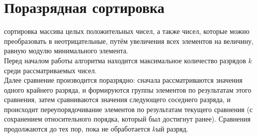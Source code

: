 \section{Поразрядная сортировка}
 сортировка массива целых положительных чисел, а также чисел, которые можно преобразовать в неотрицательные, путём увеличения всех элементов на величину, равную модулю минимального элемента.\\

Перед началом работы алгоритма находится максимальное количество разрядов $k$ среди рассматриваемых чисел.\\

Далее сравнение производится поразрядно: сначала рассматриваются значения одного крайнего разряда, и формируются группы элементов по результатам этого сравнения, затем сравниваются значения следующего соседнего разряда, и происходит переупорядочивание элементов по результатам текущего сравнения (с сохранением относительного порядка, который был достигнут ранее). Сравнения продолжаются до тех пор, пока не обработается $k$ый разряд.\\

